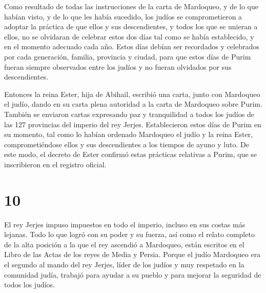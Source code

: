 Como resultado de todas las instrucciones de la carta de Mardoqueo, y de
lo que habían visto, y de lo que les había sucedido,  los
judíos se comprometieron a adoptar la práctica de que ellos y sus
descendientes, y todos los que se unieran a ellos, no se olvidaran de
celebrar estos dos días tal como se había establecido, y en el momento
adecuado cada año.  Estos días debían ser recordados y
celebrados por cada generación, familia, provincia y ciudad, para que
estos días de Purim fueran siempre observados entre los judíos y no
fueran olvidados por sus descendientes.

 Entonces la reina Ester, hija de Abihail, escribió una
carta, junto con Mardoqueo el judío, dando en su carta plena autoridad a
la carta de Mardoqueo sobre Purim.  También se enviaron
cartas expresando paz y tranquilidad a todos los judíos de las 127
provincias del imperio del rey Jerjes.  Establecieron estos
días de Purim en su momento, tal como lo habían ordenado Mardoqueo el
judío y la reina Ester, comprometiéndose ellos y sus descendientes a los
tiempos de ayuno y luto.  De este modo, el decreto de Ester
confirmó estas prácticas relativas a Purim, que se inscribieron en el
registro oficial.

\hypertarget{section-9}{%
\section{10}\label{section-9}}

 El rey Jerjes impuso impuestos en todo el imperio, incluso
en sus costas más lejanas.  Todo lo que logró con su poder y
su fuerza, así como el relato completo de la alta posición a la que el
rey ascendió a Mardoqueo, están escritos en el Libro de las Actas de los
reyes de Media y Persia.  Porque el judío Mardoqueo era el
segundo al mando del rey Jerjes, líder de los judíos y muy respetado en
la comunidad judía, trabajó para ayudar a su pueblo y para mejorar la
seguridad de todos los judíos.
